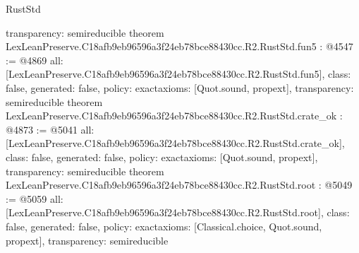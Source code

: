 \begin{lexlean}{RustStd}
\begin{coremodule}
{  transparency: semireducible
}
theorem LexLeanPreserve.C18afb9eb96596a3f24eb78bce88430cc.R2.RustStd.fun5 : @4547 := @4869 {
  all: [LexLeanPreserve.C18afb9eb96596a3f24eb78bce88430cc.R2.RustStd.fun5],
  class: false,
  generated: false,
  policy: exact{axioms: [Quot.sound, propext]},
  transparency: semireducible
}
theorem LexLeanPreserve.C18afb9eb96596a3f24eb78bce88430cc.R2.RustStd.crate_ok : @4873 := @5041 {
  all: [LexLeanPreserve.C18afb9eb96596a3f24eb78bce88430cc.R2.RustStd.crate_ok],
  class: false,
  generated: false,
  policy: exact{axioms: [Quot.sound, propext]},
  transparency: semireducible
}
theorem LexLeanPreserve.C18afb9eb96596a3f24eb78bce88430cc.R2.RustStd.root : @5049 := @5059 {
  all: [LexLeanPreserve.C18afb9eb96596a3f24eb78bce88430cc.R2.RustStd.root],
  class: false,
  generated: false,
  policy: exact{axioms: [Classical.choice, Quot.sound, propext]},
  transparency: semireducible
}


\end{coremodule}
\end{lexlean}
